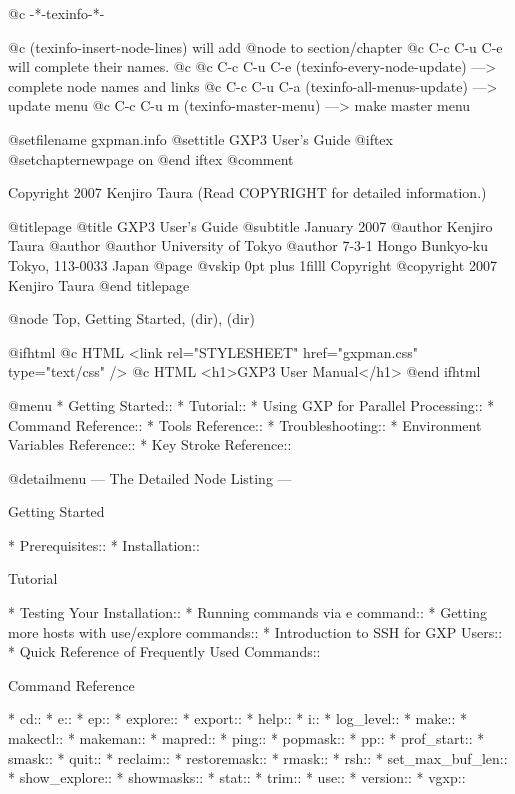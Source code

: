   @c -*-texinfo-*-

@c (texinfo-insert-node-lines) will add @node to section/chapter
@c C-c C-u C-e will complete their names.
@c 
@c C-c C-u C-e  (texinfo-every-node-update) ---> complete node names and links
@c C-c C-u C-a  (texinfo-all-menus-update)  ---> update menu
@c C-c C-u m    (texinfo-master-menu)       ---> make master menu

@setfilename gxpman.info
@settitle GXP3 User's Guide
@iftex
@setchapternewpage on
@end iftex
@comment %


Copyright 2007 Kenjiro Taura (Read COPYRIGHT for detailed information.)


@titlepage
@title GXP3 User's Guide
@subtitle January 2007
@author Kenjiro Taura
@author
@author University of Tokyo
@author 7-3-1 Hongo Bunkyo-ku Tokyo, 113-0033 Japan
@page
@vskip 0pt plus 1filll
Copyright @copyright{} 2007 Kenjiro Taura
@end titlepage

@node Top, Getting Started, (dir), (dir)

@ifhtml
@c HTML <link rel="STYLESHEET" href="gxpman.css" type="text/css" />
@c HTML <h1>GXP3 User Manual</h1>
@end ifhtml

@menu
* Getting Started::             
* Tutorial::                    
* Using GXP for Parallel Processing::  
* Command Reference::           
* Tools Reference::             
* Troubleshooting::             
* Environment Variables Reference::  
* Key Stroke Reference::        

@detailmenu
 --- The Detailed Node Listing ---

Getting Started

* Prerequisites::               
* Installation::                

Tutorial

* Testing Your Installation::   
* Running commands via e command::  
* Getting more hosts with use/explore commands::  
* Introduction to SSH for GXP Users::  
* Quick Reference of Frequently Used Commands::  

Command Reference

* cd::                          
* e::                           
* ep::                          
* explore::                     
* export::                      
* help::                        
* i::                           
* log_level::                   
* make::                        
* makectl::                     
* makeman::                     
* mapred::                      
* ping::                        
* popmask::                     
* pp::                          
* prof_start::                  
* smask::                       
* quit::                        
* reclaim::                     
* restoremask::                 
* rmask::                       
* rsh::                         
* set_max_buf_len::             
* show_explore::                
* showmasks::                   
* stat::                        
* trim::                        
* use::                         
* version::                     
* vgxp::                        

